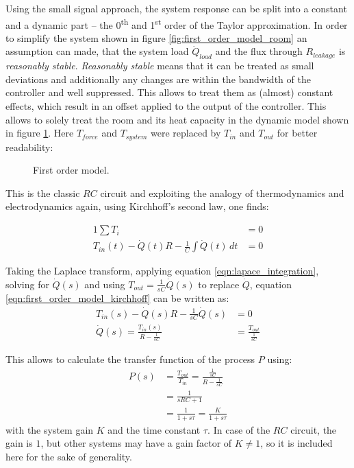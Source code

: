 Using the small signal approach, the system response can be split into a constant and a dynamic part -- the 0\textsuperscript{th} and 1\textsuperscript{st} order of the Taylor approximation. In order to simplify the system shown in figure \ref{fig:first_order_model_room} an assumption can made, that the system load $\dot Q_{load}$ and the flux through $R_{leakage}$ is \textit{reasonably stable}. \textit{Reasonably stable} means that it can be treated as small deviations and additionally any changes are within the bandwidth of the controller and well suppressed. This allows to treat them as (almost) constant effects, which result in an offset applied to the output of the controller. This allows to solely treat the room and its heat capacity in the dynamic model shown in figure \ref{fig:first_order_model}. Here $T_{force}$ and $T_{system}$ were replaced by $T_{in}$ and $T_{out}$ for better readability:

\begin{figure}[hb]
    \centering
    \caption{First order model.}
    \label{fig:first_order_model}
\end{figure}

This is the classic $RC$ circuit and exploiting the analogy of thermodynamics and electrodynamics again, using Kirchhoff's second law, one finds:

\begin{alignat}{1}
    \sum T_i &= 0 \nonumber\\
    T_{in}(t) - \dot{Q}(t) R - \frac 1 C \int \dot{Q}(t)\,dt &= 0 \label{eqn:first_order_model_kirchhoff}
\end{alignat}

Taking the Laplace transform, applying equation \ref{eqn:lapace_integration}, solving for $ \dot Q(s)$ and using $T_{out} = \frac{1}{sC} \dot Q(s)$ to replace $\dot Q$, equation \ref{eqn:first_order_model_kirchhoff} can be written as:
\begin{align*}
    T_{in}(s) - \dot{Q}(s) R - \frac{1}{sC} \dot{Q}(s) &= 0\\
    \dot{Q}(s) = \frac{T_{in}(s)}{R-\frac{1}{sC}} &= \frac{T_{out}}{\frac{1}{sC}}
\end{align*}

This allows to calculate the transfer function of the process $P$ using:
\begin{align}
    P(s) &= \frac{T_{out}}{T_{in}} = \frac{\frac{1}{sC}}{R-\frac{1}{sC}} \nonumber\\
    &= \frac{1}{sRC + 1} \nonumber\\
    &= \frac{1}{1 + s\tau} = \frac{K}{1 + s\tau} \label{eqn:first_order_model}
\end{align}
with the system gain $K$ and the time constant $\tau$. In case of the $RC$ circuit, the gain is $1$, but other systems may have a gain factor of $K \neq 1$, so it is included here for the sake of generality.

